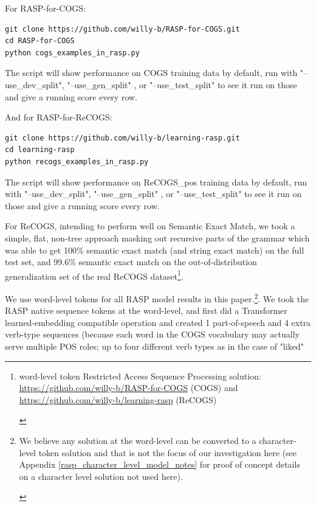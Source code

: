 \documentclass[11pt]{article}
\begin{document}
For RASP-for-COGS:
\begin{tiny}
\begin{verbatim}
git clone https://github.com/willy-b/RASP-for-COGS.git
cd RASP-for-COGS
python cogs_examples_in_rasp.py
\end{verbatim}
\end{tiny}

The script will show performance on COGS training data by default, run with "--use\_dev\_split", "--use\_gen\_split" , or "--use\_test\_split" to see it run on those and give a running score every row.

And for RASP-for-ReCOGS:
\begin{tiny}
\begin{verbatim}
git clone https://github.com/willy-b/learning-rasp.git
cd learning-rasp
python recogs_examples_in_rasp.py
\end{verbatim}
\end{tiny}

The script will show performance on \citep{Wu2023} ReCOGS\_pos training data by default, run with "--use\_dev\_split", "--use\_gen\_split" , or "--use\_test\_split" to see it run on those and give a running score every row.

For ReCOGS, intending to perform well on Semantic Exact Match, we took a simple, flat, non-tree approach masking out recursive parts of the grammar which was able to get 100\% semantic exact match (and string exact match) on the full test set, and 99.6\% semantic exact match on the out-of-distribution generalization set of the real ReCOGS dataset\footnote{\begin{footnotesize}word-level token Restricted Access Sequence Processing solution: \href{https://github.com/willy-b/RASP-for-COGS}{https://github.com/willy-b/RASP-for-COGS} (COGS) and \href{https://github.com/willy-b/learning-rasp}{https://github.com/willy-b/learning-rasp} (ReCOGS)\end{footnotesize}}.

We use word-level tokens for all RASP model results in this paper.\footnote{\begin{footnotesize}We believe any solution at the word-level can be converted to a character-level token solution and that is not the focus of our investigation here (see Appendix \ref{rasp_character_level_model_notes} for proof of concept details on a character level solution not used here).\end{footnotesize}}. We took the RASP native sequence tokens at the word-level, and first did a Transformer learned-embedding compatible operation and created 1 part-of-speech and 4 extra verb-type sequences (because each word in the COGS vocabulary may actually serve multiple POS roles; up to four different verb types as in the case of "liked" 
\end{document}
